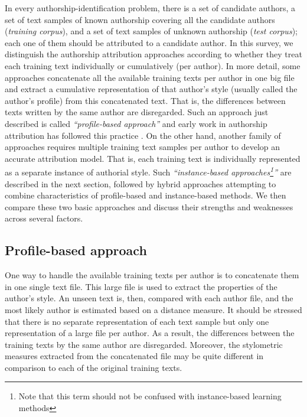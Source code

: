 In every authorship-identification problem, there is a set of candidate authors, a set of text samples of known authorship covering all the candidate authors (\textit{training corpus}), and a set of text samples of unknown authorship (\textit{test corpus}); each
one of them should be attributed to a candidate author. In this survey, we distinguish the authorship attribution approaches according to whether they treat each training text individually or cumulatively (per author). In more detail, some approaches concatenate all the available training texts per author in one big file and extract a cumulative representation of that author’s style (usually called the author’s profile) from
this concatenated text. That is, the differences between texts
written by the same author are disregarded. Such an approach just described is called \textit{\enquote{profile-based approach}} and early work in authorship attribution has followed this practice \cite{mosteller2007inference}.
On the other hand, another family of approaches requires multiple training text samples per author to develop an accurate attribution model. That is, each training text is
individually represented as a separate instance of authorial style. Such \textit{\enquote{instance-based approaches\footnote{Note that this term should not be confused with instance-based learning methods\cite{mitchell1997artificial}}}} are described in the
next section, followed by hybrid approaches attempting to combine characteristics of profile-based and instance-based methods. We then compare these two basic approaches and
discuss their strengths and weaknesses across several factors.

\subsection{Profile-based approach}

One way to handle the available training texts per author is to concatenate them in one single text file. This large file is used to extract the properties of the author’s style. An unseen text is, then, compared with each author file, and the most likely author is estimated based on a distance measure. It should be stressed that there is no separate representation of each text sample but only one representation of a large file per author. As a result, the differences between the training texts by the same author are disregarded. Moreover, the stylometric measures extracted from the concatenated file may be quite
different in comparison to each of the original training texts.

